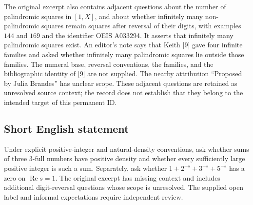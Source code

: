 \documentclass[11pt]{article}
\begin{document}
The original excerpt also contains adjacent questions about the number of palindromic squares in \([1,X]\), and about whether infinitely many non-palindromic squares remain squares after reversal of their digits, with examples \(144\) and \(169\) and the identifier OEIS A033294. It asserts that infinitely many palindromic squares exist. An editor's note says that Keith [9] gave four infinite families and asked whether infinitely many palindromic squares lie outside those families. The numeral base, reversal conventions, the families, and the bibliographic identity of [9] are not supplied. The nearby attribution ``Proposed by Julia Brandes'' has unclear scope. These adjacent questions are retained as unresolved source context; the record does not establish that they belong to the intended target of this permanent ID.
\subsection{Short English statement}
Under explicit positive-integer and natural-density conventions, ask whether sums of three \(3\)-full numbers have positive density and whether every sufficiently large positive integer is such a sum. Separately, ask whether \(1+2^{-s}+3^{-s}+5^{-s}\) has a zero on \(\operatorname{Re}s=1\). The original excerpt has missing context and includes additional digit-reversal questions whose scope is unresolved. The supplied open label and informal expectations require independent review.
\end{document}
